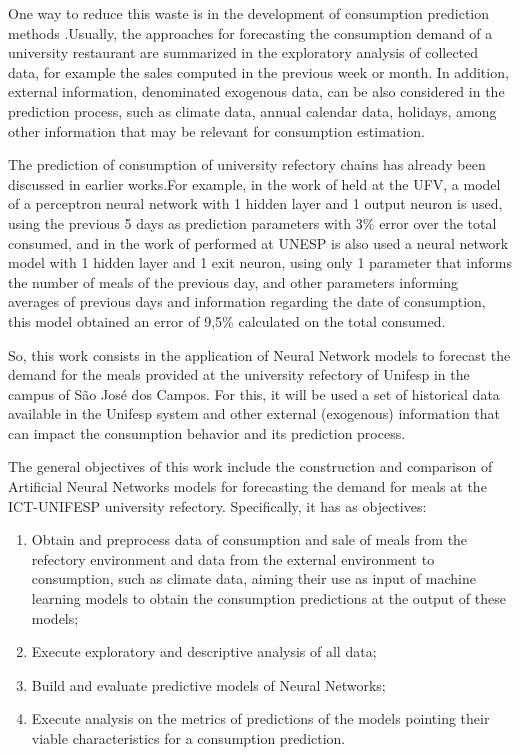 One way to reduce this waste is in the development of consumption prediction methods \cite{Lopes2008,Rocha2011}.Usually, the approaches for forecasting the consumption demand of a university restaurant are summarized in the exploratory analysis of collected data, for example the sales computed in the previous week or month.  In addition, external information, denominated exogenous data, can be also considered in the prediction process, such as climate data, annual calendar data, holidays, among other information that may be relevant for consumption estimation.

The prediction of consumption of university refectory chains has already been discussed in earlier works.For example, in the work of  held at the UFV, a model of a perceptron neural network with 1 hidden layer and 1 output neuron is used, using the previous 5 days as prediction parameters with 3\% error over the total consumed, and in the work of  performed at UNESP is also used a neural network model with 1 hidden layer and 1 exit neuron, using only 1 parameter that informs the number of meals of the previous day, and other parameters informing averages of previous days and information regarding the date of consumption, this model obtained an error of 9,5\% calculated on the total consumed.

So, this work consists in the application of Neural Network models to forecast the demand for the meals provided at the university refectory of Unifesp in the campus of São José dos Campos. For this, it will be used a set of historical data available in the Unifesp system and other external (exogenous) information that can impact the consumption behavior and its prediction process.

The general objectives of this work include the construction and comparison of Artificial Neural Networks models for forecasting the demand for meals at the ICT-UNIFESP university refectory. Specifically, it has as objectives:
\begin{enumerate}[label=\alph*)]
\item Obtain and preprocess data of consumption and sale of meals from the refectory environment and data from the external environment to consumption, such as climate data, aiming their use as input of machine learning models to obtain the consumption predictions at the output of these models;
\item Execute exploratory and descriptive analysis of all data;
\item Build and evaluate predictive models of Neural Networks;
\item Execute analysis on the metrics of predictions of the models pointing their viable characteristics for a consumption prediction.
\end{enumerate}

